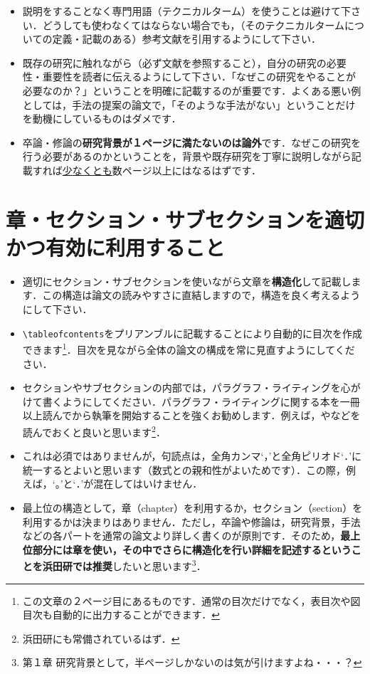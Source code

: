 \documentclass[dvipdfmx,autodetect-engine]{jsreport}
\begin{document}
\begin{itemize}
\item 説明をすることなく専門用語（テクニカルターム）を使うことは避けて下さい．どうしても使わなくてはならない場合でも，（そのテクニカルタームについての定義・記載のある）参考文献を引用するようにして下さい．
\item  既存の研究に触れながら（必ず文献を参照すること），自分の研究の必要性・重要性を読者に伝えるようにして下さい．「なぜこの研究をやることが必要なのか？」ということを明確に記載するのが重要です．よくある悪い例としては，手法の提案の論文で，「そのような手法がない」ということだけを動機にしているものはダメです．
\item 卒論・修論の\textbf{研究背景が１ページに満たないのは論外}です．なぜこの研究を行う必要があるのかということを，背景や既存研究を丁寧に説明しながら記載すれば\underline{少なくとも}数ページ以上にはなるはずです．
\end{itemize}

\section{章・セクション・サブセクションを適切かつ有効に利用すること}

\begin{itemize}
\item 適切にセクション・サブセクションを使いながら文章を\textbf{構造化}して記載します．この構造は論文の読みやすさに直結しますので，構造を良く考えるようにして下さい．
\item \texttt{\textbackslash tableofcontents}をプリアンブルに記載することにより自動的に目次を作成できます\footnote{この文章の２ページ目にあるものです．通常の目次だけでなく，表目次や図目次も自動的に出力することができます．}．目次を見ながら全体の論文の構成を常に見直すようにしてください．
\item セクションやサブセクションの内部では，パラグラフ・ライティングを心がけて書くようにしてください．パラグラフ・ライティングに関する本を一冊以上読んでから執筆を開始することを強くお勧めします．例えば，\cite{倉島201211}や\cite{木下198109}などを読んでおくと良いと思います\footnote{浜田研にも常備されているはず．}．
\item これは必須ではありませんが，句読点は，全角カンマ`，'と全角ピリオド`．'に統一するとよいと思います（数式との親和性がよいためです）．この際，例えば，`。'と`．'が混在してはいけません．
\item 最上位の構造として，章（chapter）を利用するか，セクション（section）を利用するかは決まりはありません．ただし，卒論や修論は，研究背景，手法などの各パートを通常の論文より詳しく書くのが原則です．そのため，\textbf{最上位部分には章を使い，その中でさらに構造化を行い詳細を記述するということを浜田研では推奨}したいと思います\footnote{第１章 研究背景として，半ページしかないのは気が引けますよね・・・？}．
\end{itemize}
\end{document}
